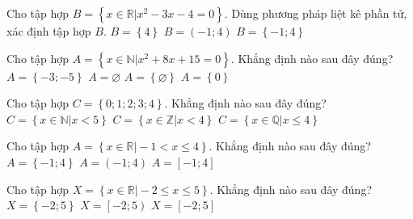 \begin{ex}%
	Cho tập hợp $B = \left\{x \in \mathbb{R}\big| x^2 - 3x - 4 = 0\right\}$. Dùng phương pháp liệt kê phần tử, xác định tập hợp $B$.
	{$B = \left\{4\right\}$}
	{$B = \left(-1;4\right)$}
	{\True $B = \left\{-1;4\right\}$}
\end{ex}

\begin{ex}%
	Cho tập hợp $A = \left\{x \in \mathbb{N}\big| x^2 + 8x + 15 = 0\right\}$. Khẳng định nào sau đây đúng?
	\choice
	{$A = \left\{-3;-5\right\}$}
	{\True $A =\varnothing$}
	{$A = \left\{\varnothing\right\}$}
	{$A = \left\{0\right\}$}
\end{ex}

\begin{ex}%
	Cho tập hợp $C = \left\{0;1;2;3;4\right\}$. Khẳng định nào sau đây đúng?
	{\True $C = \left\{x \in \mathbb{N}\big|x < 5\right\}$}
	{$C = \left\{x \in \mathbb{Z}\big|x < 4\right\}$}
	{$C = \left\{x \in \mathbb{Q}\big|x \le 4\right\}$}
\end{ex}

\begin{ex}%
	Cho tập hợp $A = \left\{x \in \mathbb{R}\big|- 1< x \le 4\right\}$. Khẳng định nào sau đây đúng?
	\choice{\True $A = \left(-1;4\right]$}
	{$A = \left\{-1;4\right\}$}
	{$A = \left(-1;4\right)$}
	{$A = \left[-1;4\right]$}
	\loigiai{
		$\left\{x \in \mathbb{R}\big|- 1< x \le 4\right\}=\left(-1;4\right]$.
	}
\end{ex}

\begin{ex}%
	Cho tập hợp $X = \left\{x \in \mathbb{R}\big|- 2\le x \le 5\right\}$. Khẳng định nào sau đây đúng?
	{$X = \left\{-2;5\right\}$}
	{$X = \left[-2;5\right)$}
	{\True $X = \left[-2;5\right]$}
\end{ex}

